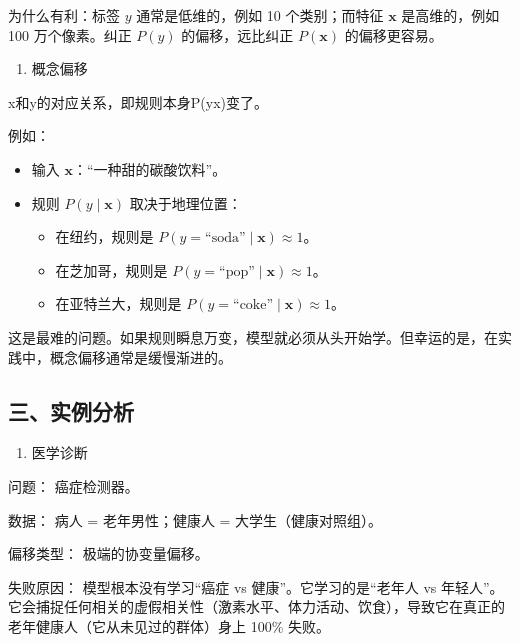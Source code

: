 为什么有利：标签 \(y\) 通常是低维的，例如 10 个类别；而特征 \(\mathbf{x}\) 是高维的，例如 100 万个像素。纠正 \(P(y)\) 的偏移，远比纠正 \(P(\mathbf{x})\) 的偏移更容易。

\begin{enumerate}
\def\labelenumi{\arabic{enumi}.}
\setcounter{enumi}{2}
\tightlist
\item
  概念偏移
\end{enumerate}

x和y的对应关系，即规则本身P(y\textbar x)变了。

例如：

\begin{itemize}
\tightlist
\item
  输入 \(\mathbf{x}\)：``一种甜的碳酸饮料''。
\item
  规则 \(P(y\mid\mathbf{x})\) 取决于地理位置：

  \begin{itemize}
  \tightlist
  \item
    在纽约，规则是 \(P(y=\text{“soda”}\mid\mathbf{x})\approx 1\)。
  \item
    在芝加哥，规则是 \(P(y=\text{“pop”}\mid\mathbf{x})\approx 1\)。
  \item
    在亚特兰大，规则是 \(P(y=\text{“coke”}\mid\mathbf{x})\approx 1\)。
  \end{itemize}
\end{itemize}

这是最难的问题。如果规则瞬息万变，模型就必须从头开始学。但幸运的是，在实践中，概念偏移通常是缓慢渐进的。

\hypertarget{ux4e09ux5b9eux4f8bux5206ux6790}{%
\subsection{三、实例分析}\label{ux4e09ux5b9eux4f8bux5206ux6790}}

\begin{enumerate}
\def\labelenumi{\arabic{enumi}.}
\tightlist
\item
  医学诊断
\end{enumerate}

问题： 癌症检测器。

数据： 病人 = 老年男性；健康人 = 大学生（健康对照组）。

偏移类型： 极端的协变量偏移。

失败原因： 模型根本没有学习``癌症 vs 健康''。它学习的是``老年人 vs 年轻人''。它会捕捉任何相关的虚假相关性（激素水平、体力活动、饮食），导致它在真正的老年健康人（它从未见过的群体）身上 100\% 失败。

